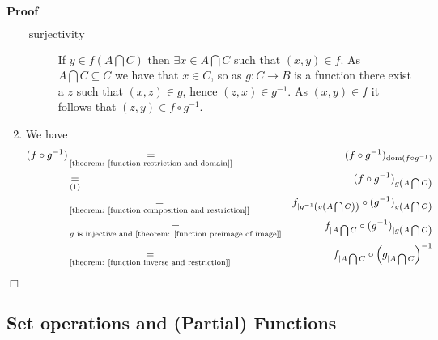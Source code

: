 \documentclass{book}
\newcommand{\equallim}{\mathop{=}\limits}
\newcommand{\tmop}[1]{\ensuremath{\operatorname{#1}}}
\newenvironment{proof}{\noindent\textbf{Proof\ }}{\hspace*{\fill}$\Box$\medskip}
\begin{document}
\begin{proof}
\begin{enumerate}
\begin{description}
      \item[$\tmop{surjectivity}$] If $y \in f \left( A \bigcap C \right)$
      then $\exists x \in A \bigcap C$ such that $ (x, y) \in f$. As $A
      \bigcap C \subseteq C$ we have that $x \in C$, so as $g : C \rightarrow
      B$ is a function there exist a $z$ such that $(x, z) \in g$, hence $(z,
      x) \in g^{- 1}$. As $(x, y) \in f$ it follows that $(z, y) \in f \circ
      g^{- 1}$.
    \end{description}
    \item We have
    \begin{eqnarray*}
      (f \circ g^{- 1}) & \equallim_{\text{[theorem: \ref{function restriction
      and domain}]}} & (f \circ g^{- 1})_{\tmop{dom} (f \circ g^{- 1})}\\
      & \equallim_{(1) \text{}} & (f \circ g^{- 1})_{g \left( A \bigcap C
      \right)}\\
      & \equallim_{\text{[theorem: \ref{function composition and
      restriction}]}} & f_{|g^{- 1} \left( g \left( A \bigcap C \right)
      \right)} \circ (g^{- 1})_{g \left( A \bigcap C \right)}\\
      & \equallim_{g \text{ is injective and [theorem: \ref{function preimage
      of image}]}} & f_{|A \bigcap C} \circ (g^{- 1})_{|g \left( A \bigcap C
      \right)}\\
      & \equallim_{\text{[theorem: \ref{function inverse and restriction}]}}
      & f_{|A \bigcap C} \circ \left( g_{|A \bigcap C} \right)^{- 1}
    \end{eqnarray*}
  \end{enumerate}
\end{proof}

\subsection{Set operations and (Partial) Functions}
\end{document}
